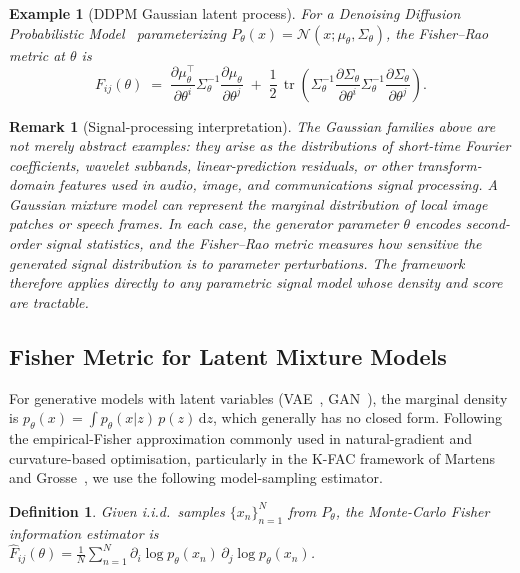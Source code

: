 \documentclass[a4paper,fleqn]{cas-dc}
\newtheorem{definition}{Definition}
\newtheorem{remark}{Remark}
\newtheorem{example}{Example}
\DeclareMathOperator{\tr}{tr}
\begin{document}
\begin{example}[DDPM Gaussian latent process]
  \label{ex:ddpm}
  For a Denoising Diffusion Probabilistic Model~\cite{ho2020denoising}
  parameterizing $P_\theta(x) = \mathcal{N}(x;\mu_\theta,\Sigma_\theta)$,
  the Fisher--Rao metric at $\theta$ is
  \begin{equation}
    F_{ij}(\theta) \;=\;
    \frac{\partial\mu_\theta^\top}{\partial\theta^i}
    \Sigma_\theta^{-1}
    \frac{\partial\mu_\theta}{\partial\theta^j}
    \;+\;
    \frac{1}{2}\,\tr\!\left(
      \Sigma_\theta^{-1}
      \frac{\partial\Sigma_\theta}{\partial\theta^i}
      \Sigma_\theta^{-1}
      \frac{\partial\Sigma_\theta}{\partial\theta^j}
    \right).
    \label{eq:fisher_ddpm}
  \end{equation}
\end{example}

\begin{remark}[Signal-processing interpretation]
  The Gaussian families above are not merely abstract examples: they arise as
  the distributions of short-time Fourier coefficients, wavelet subbands,
  linear-prediction residuals, or other transform-domain features used in
  audio, image, and communications signal processing.  A Gaussian mixture
  model can represent the marginal distribution of local image patches or
  speech frames.  In each case, the generator parameter $\theta$ encodes
  second-order signal statistics, and the Fisher--Rao metric measures how
  sensitive the generated signal distribution is to parameter perturbations.
  The framework therefore applies directly to any parametric signal model
  whose density and score are tractable.
\end{remark}

\subsection{Fisher Metric for Latent Mixture Models}
\label{subsec:mixture}

For generative models with latent variables (VAE~\cite{kingma2014vae},
GAN~\cite{goodfellow2014generative}), the marginal density is
$p_\theta(x) = \int p_\theta(x|z)\,p(z)\,\mathrm{d}z$,
which generally has no closed form.
Following the empirical-Fisher approximation commonly used in natural-gradient
and curvature-based optimisation, particularly in the K-FAC framework of
Martens and Grosse~\cite{martens2015optimizing}, we use the following model-sampling estimator.

\begin{definition}%
  \label{def:empirical_fisher}
  Given i.i.d.\ samples $\{x_n\}_{n=1}^N$ from $P_\theta$, the
  \emph{Monte-Carlo Fisher information estimator} is\\
  $\widehat{F}_{ij}(\theta) = \frac{1}{N}\sum_{n=1}^N
    \partial_i\log p_\theta(x_n)\, \partial_j\log p_\theta(x_n)$.
\end{definition}
\end{document}
